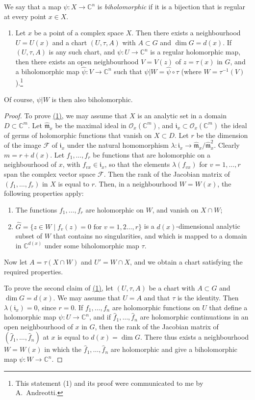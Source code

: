 \documentclass{article}
\theoremstyle{plain}
\newcommand{\scr}[1]{{\mathscr{#1}}}
\newcommand{\CC}{\mathbb{C}}
\newcommand{\fk}{\mathfrak}
\newcommand{\oldpage}[1]{\marginpar{\footnotesize$\Big\vert$ \textit{p.~#1}}}
\begin{document}
We say that a map $\psi\colon X\to\CC^n$ is \emph{biholomorphic} if it is a bijection that is regular at every point $x\in X$.

\begin{enumerate}[(1)]
  \itshape
  \item Let $x$ be a point of a complex space $X$.
    Then there exists a neighbourhood $U=U(x)$ and a chart $(U,\tau,A)$ with $A\subset G$ and $\dim G=d(x)$.
    If $(U,\tau,A)$ is any such chart, and $\psi\colon U\to\CC^n$ is a regular holomorphic map, then there exists an open neighbourhood $V=V(z)$ of $z=\tau(x)$ in $G$, and a biholomorphic map $\hat{\psi}\colon V\to\CC^n$ such that $\psi|W=\hat{\psi}\circ\tau$ (where $W=\tau^{-1}(V)$).\footnote{This statement (1) and its proof were communicated to me by A.~Andreotti.}
    \label{(1)}
\end{enumerate}

Of course, $\psi|W$ is then also biholomorphic.

\begin{proof}
To prove \hyperref[(1)]{(1)}, we may assume that $X$ is an analytic set in a domain $D\subset\CC^m$.
Let $\hat{\fk{m}}_x$ be the maximal ideal in $\scr{O}_x(\CC^m)$, and $\fk{i}_x\subset\scr{O}_x(\CC^m)$ the ideal of germs of holomorphic functions that vanish on $X\subset D$.
Let $r$ be the dimension of the image $\scr{F}$ of $\fk{i}_x$ under the natural homomorphism $\lambda\colon\fk{i}_x\to\hat{\fk{m}}_x/\hat{\fk{m}}_x^2$.
Clearly $m=r+d(x)$.
Let $f_1,\ldots,f_r$ be functions that are holomorphic on a neighbourhood of $x$, with $f_{vx}\in\fk{i}_x$, so that the elements $\lambda(f_{vx})$ for $v=1,\ldots,r$ span the complex vector space $\scr{F}$.
Then the rank of the Jacobian matrix of $(f_1,\ldots,f_r)$ in $X$ is equal to $r$.
Then, in a neighbourhood $W=W(x)$, the following properties apply:
\oldpage{334}
\begin{enumerate}[1)]
  \item The functions $f_1,\ldots,f_r$ are holomorphic on $W$, and vanish on $X\cap W$;
  \item $\hat{G}=\{z\in W\mid \mbox{$f_v(z)=0$ for $v=1,2\ldots,r$}\}$ is a $d(x)$-dimensional analytic subset of $W$ that contains no singularities, and which is mapped to a domain in $\CC^{d(x)}$ under some biholomorphic map $\tau$.
\end{enumerate}

Now let $A=\tau(X\cap W)$ and $U'=W\cap X$, and we obtain a chart satisfying the required properties.

To prove the second claim of \hyperref[(1)]{(1)}, let $(U,\tau,A)$ be a chart with $A\subset G$ and $\dim G=d(x)$.
We may assume that $U=A$ and that $\tau$ is the identity.
Then $\lambda(\fk{i}_x)=0$, since $r=0$.
If $f_1,\ldots,f_n$ are holomorphic functions on $U$ that define a holomorphic map $\psi\colon U\to\CC^n$, and if $\hat{f}_1,\ldots,\hat{f}_n$ are holomorphic continuations in an open neighbourhood of $x$ in $G$, then the rank of the Jacobian matrix of $(\hat{f}_1,\ldots,\hat{f}_n)$ at $x$ is equal to $d(x)=\dim G$.
There thus exists a neighbourhood $W=W(x)$ in which the $\hat{f}_1,\ldots,\hat{f}_n$ are holomorphic and give a biholomorphic map $\psi\colon W\to\CC^n$.
\end{proof}
\end{document}

